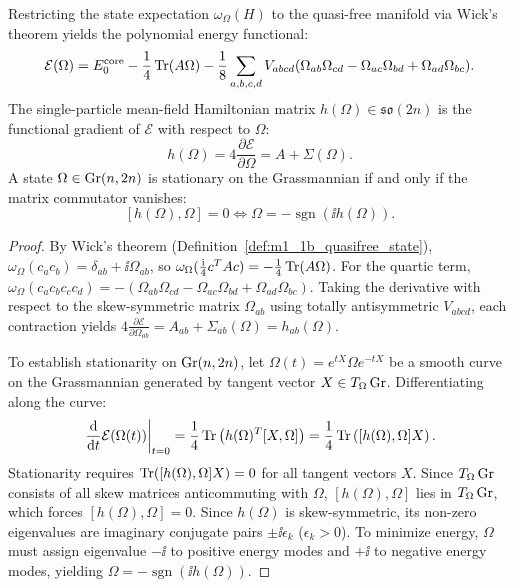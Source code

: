 \begin{theorem}
\label{thm:m1_1b_energy_gradient}
Restricting the state expectation $\omega_\Omega(H)$ to the quasi-free manifold via Wick's theorem yields the polynomial energy functional:
\begin{equation}
\label{eq:m1_1b_quasifree_energy}
\mathcal{E}(\Omega) = E_0^{\mathrm{core}} - \frac{1}{4} \operatorname{Tr}(A \Omega) - \frac{1}{8} \sum_{a,b,c,d} V_{abcd} (\Omega_{ab}\Omega_{cd} - \Omega_{ac}\Omega_{bd} + \Omega_{ad}\Omega_{bc}).
\end{equation}
The single-particle mean-field Hamiltonian matrix $h(\Omega) \in \mathfrak{so}(2n)$ is the functional gradient of $\mathcal{E}$ with respect to $\Omega$:
\begin{equation}
\label{eq:m1_1b_hmf_gradient}
h(\Omega) = 4 \frac{\partial \mathcal{E}}{\partial \Omega} = A + \Sigma(\Omega).
\end{equation}
A state $\Omega \in \operatorname{Gr}(n, 2n)$ is stationary on the Grassmannian if and only if the matrix commutator vanishes:
\begin{equation}
\label{eq:m1_1b_euler_lagrange_stationarity}
[h(\Omega), \Omega] = 0 \iff \Omega = -\operatorname{sgn}(\ii h(\Omega)).
\end{equation}
\end{theorem}
\begin{proof}
By Wick's theorem (Definition~\ref{def:m1_1b_quasifree_state}), $\omega_\Omega(c_a c_b) = \delta_{ab} + \ii \Omega_{ab}$, so $\omega_\Omega(\frac{\mathrm{i}}{4} c^T A c) = -\frac{1}{4}\operatorname{Tr}(A\Omega)$. For the quartic term, $\omega_\Omega(c_a c_b c_c c_d) = -(\Omega_{ab}\Omega_{cd} - \Omega_{ac}\Omega_{bd} + \Omega_{ad}\Omega_{bc})$. Taking the derivative with respect to the skew-symmetric matrix $\Omega_{ab}$ using totally antisymmetric $V_{abcd}$, each contraction yields $4 \frac{\partial \mathcal{E}}{\partial \Omega_{ab}} = A_{ab} + \Sigma_{ab}(\Omega) = h_{ab}(\Omega)$.

To establish stationarity on $\operatorname{Gr}(n, 2n)$, let $\Omega(t) = e^{t X} \Omega e^{-t X}$ be a smooth curve on the Grassmannian generated by tangent vector $X \in T_\Omega \operatorname{Gr}$. Differentiating along the curve:
\begin{equation}
\left.\frac{\mathrm{d}}{\mathrm{d} t}\mathcal{E}(\Omega(t))\right|_{t=0} = \frac{1}{4} \operatorname{Tr}\left( h(\Omega)^T [X, \Omega] \right) = \frac{1}{4} \operatorname{Tr}\left( [h(\Omega), \Omega] X \right).
\end{equation}
Stationarity requires $\operatorname{Tr}([h(\Omega), \Omega] X) = 0$ for all tangent vectors $X$. Since $T_\Omega \operatorname{Gr}$ consists of all skew matrices anticommuting with $\Omega$, $[h(\Omega), \Omega]$ lies in $T_\Omega \operatorname{Gr}$, which forces $[h(\Omega), \Omega] = 0$. Since $h(\Omega)$ is skew-symmetric, its non-zero eigenvalues are imaginary conjugate pairs $\pm \ii \epsilon_k$ ($\epsilon_k > 0$). To minimize energy, $\Omega$ must assign eigenvalue $-\ii$ to positive energy modes and $+\ii$ to negative energy modes, yielding $\Omega = -\operatorname{sgn}(\ii h(\Omega))$.
\end{proof}


